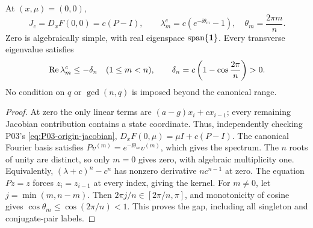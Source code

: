 \begin{lemma}
\label{lem:P09-gap}
At $(x,\mu)=(0,0)$,
\begin{equation}
 J_c=D_xF(0,0)=c(P-I),\qquad
 \lambda_m^c=c(e^{-\ii\theta_m}-1),\quad \theta_m=\frac{2\pi m}{n}.
 \label{eq:P09-critical-spectrum}
\end{equation}
Zero is algebraically simple, with real eigenspace
$\operatorname{span}\{\mathbf{1}\}$. Every transverse eigenvalue satisfies
\begin{equation}
 \operatorname{Re}\lambda_m^c\le-\delta_n\quad(1\le m<n),\qquad
 \delta_n=c\left(1-\cos\frac{2\pi}{n}\right)>0.
 \label{eq:P09-gap}
\end{equation}
No condition on $q$ or $\gcd(n,q)$ is imposed beyond the canonical range.
\end{lemma}
\begin{proof}
At zero the only linear terms are $(a-g)x_i+cx_{i-1}$; every remaining
Jacobian contribution contains a state coordinate. Thus, independently
checking P03's \eqref{eq:P03-origin-jacobian},
$D_xF(0,\mu)=\mu I+c(P-I)$. The canonical Fourier basis satisfies
$Pv^{(m)}=e^{-\ii\theta_m}v^{(m)}$, which gives the spectrum.
The $n$ roots of unity are distinct, so only $m=0$ gives zero, with
algebraic multiplicity one. Equivalently, $(\lambda+c)^n-c^n$ has
nonzero derivative $nc^{n-1}$ at zero. The equation $Pz=z$ forces
$z_i=z_{i-1}$ at every index, giving the kernel.
For $m\ne0$, let $j=\min(m,n-m)$. Then
$2\pi j/n\in[2\pi/n,\pi]$, and monotonicity of cosine gives
$\cos\theta_m\le\cos(2\pi/n)<1$. This proves the gap, including
all singleton and conjugate-pair labels.
\end{proof}

